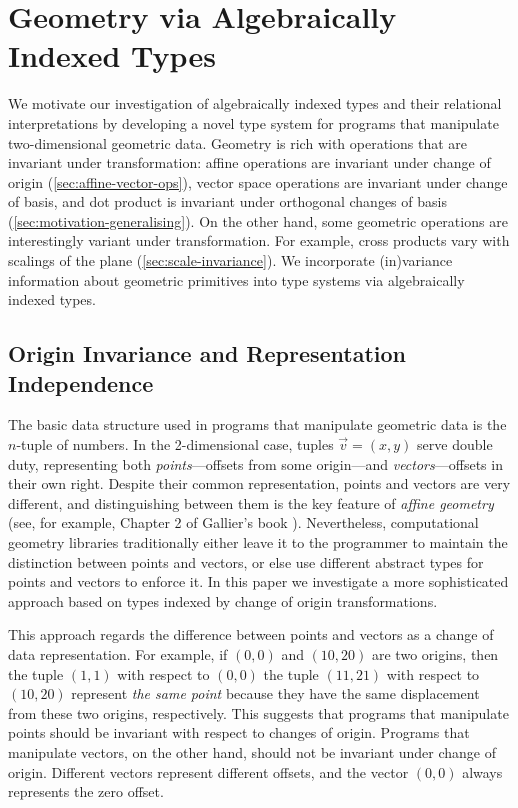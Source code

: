 \section{Geometry via Algebraically Indexed Types}
\label{sec:motivating-examples}

We motivate our investigation of algebraically indexed types and their
relational interpretations by developing a novel type system for
programs that manipulate two-dimensional geometric data. Geometry is
rich with operations that are invariant under transformation: affine
operations are invariant under change of origin
(\autoref{sec:affine-vector-ops}), vector space operations are
invariant under change of basis, and dot product is invariant under
orthogonal changes of basis
(\autoref{sec:motivation-generalising}). On the other hand, some
geometric operations are interestingly variant under transformation.
For example, cross products vary with scalings of the plane
(\autoref{sec:scale-invariance}). We incorporate (in)variance
information about geometric primitives into type systems via
algebraically indexed types.

\subsection{Origin Invariance and Representation Independence}\label{sec:oiri}

The basic data structure used in programs that manipulate geometric data is
the $n$-tuple of numbers. In the 2-dimensional case, tuples 
$\vec{v} = (x,y)$ serve double duty, representing
both \emph{points}---offsets from some origin---and
\emph{vectors}---offsets in their own right.  Despite their common
representation, points and vectors are very different, and
distinguishing between them is the key feature of \emph{affine
  geometry} (see, for example, Chapter 2 of Gallier's book
\cite{gallier11geometric}). Nevertheless, computational geometry
libraries traditionally either leave it to the programmer to maintain
the distinction between points and vectors, or else use different
abstract types for points and vectors to enforce it.
In this paper we investigate a more sophisticated approach based on 
types indexed by change of origin transformations.

This approach regards the difference between points and vectors as a
change of data representation. For example, if $(0,0)$ and $(10,20)$
are two origins, then the tuple $(1,1)$ with respect to $(0,0)$ the
tuple $(11,21)$ with respect to $(10,20)$ represent \emph{the same
  point} because they have the same displacement from these two
origins, respectively.
This suggests that programs that manipulate points %
should be invariant with respect to changes of
origin. Programs that manipulate vectors, on the other hand, should
not be invariant under change of origin. Different vectors represent
different offsets, and the vector $(0,0)$ always represents the zero
offset.

